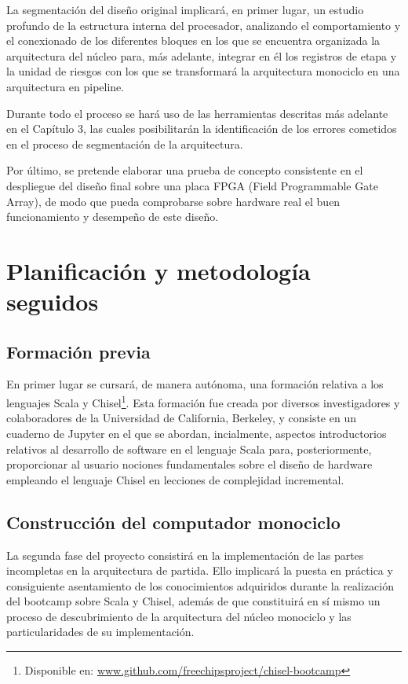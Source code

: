 La segmentación del diseño original implicará, en primer lugar, un estudio profundo de la estructura interna del procesador, analizando el comportamiento y el conexionado de los diferentes bloques en los que se encuentra organizada la arquitectura del núcleo para, más adelante, integrar en él los registros de etapa y la unidad de riesgos con los que se transformará la arquitectura monociclo en una arquitectura en pipeline.

Durante todo el proceso se hará uso de las herramientas descritas más adelante en el Capítulo 3, las cuales posibilitarán la identificación de los errores cometidos en el proceso de segmentación de la arquitectura.

Por último, se pretende elaborar una prueba de concepto consistente en el despliegue del diseño final sobre una placa FPGA (Field Programmable Gate Array), de modo que pueda comprobarse sobre hardware real el buen funcionamiento y desempeño de este diseño.


\section{Planificación y metodología seguidos}

\subsection{Formación previa}

En primer lugar se cursará, de manera autónoma, una formación relativa a los lenguajes Scala y Chisel\footnote{Disponible en: \url{www.github.com/freechipsproject/chisel-bootcamp}}. Esta formación fue creada por diversos investigadores y colaboradores de la Universidad de California, Berkeley, y consiste en un cuaderno de Jupyter en el que se abordan, incialmente, aspectos introductorios relativos al desarrollo de software en el lenguaje Scala para, posteriormente, proporcionar al usuario nociones fundamentales sobre el diseño de hardware empleando el lenguaje Chisel en lecciones de complejidad incremental.

\subsection{Construcción del computador monociclo}

La segunda fase del proyecto consistirá en la implementación de las partes incompletas en la arquitectura de partida. Ello implicará la puesta en práctica y consiguiente asentamiento de los conocimientos adquiridos durante la realización del bootcamp sobre Scala y Chisel, además de que constituirá en sí mismo un proceso de descubrimiento de la arquitectura del núcleo monociclo y las particularidades de su implementación.

